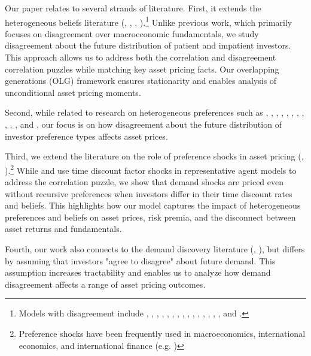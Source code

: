 \documentclass[preprint,11pt,authoryear]{elsarticle}
\theoremstyle{plain}
\begin{document}
Our paper relates to several strands of literature. First, it extends the heterogeneous beliefs literature (\cite{Harrison1978}, \cite{DetempleMurthy1994}, \cite{Zapatero1998}, \cite{Basak2000}).\footnote{Models with disagreement include \cite{ScheinkmanXiong2003}, \cite{Basak2005}, \cite{Berrada2006}, \cite{Burschi06}, \cite{JouiniNapp2007}, \cite{David2008}, \cite{Dumas2009}, \cite{xiong-yan-2010}, \cite{Cvitanic2011}, \cite{cvitanic-jouini-malamud-napp:12}, \cite{BhamraUppal2014}, \cite{Burschi14}, \cite{CujeanHasler17}, \cite{EGHI2017},  \cite{BauerChernov2024a}, and \cite{XiourosZapatero2024}.} Unlike previous work, which primarily focuses on disagreement over macroeconomic fundamentals, we study disagreement about the future distribution of patient and impatient investors. This approach allows us to address both the correlation and disagreement correlation puzzles while matching key asset pricing facts. Our overlapping generations (OLG) framework ensures stationarity and enables analysis of unconditional asset pricing moments.


Second, while related to research on heterogeneous preferences such as \cite{dumas:89}, \cite{wang:96}, \cite{chan-kogan:02}, \cite{GollierZeckhauser05}, \cite{GomesMichaelides08}, \cite{weinbaum:09}, \cite{zapatero-xiouros:10}, \cite{cvitanic-jouini-malamud-napp:12}, \cite{longstaff-wang:12}, \cite{BhamraUppal2014}, \cite{Garleanu2008}, and \cite{EhlingHeyerdahlLarsen2016}, our focus is on how disagreement about the future distribution of investor preference types affects asset prices.  



Third, we extend the literature on the role of preference shocks in asset pricing (\cite{GarberKing83}, \cite{Campbell93}).\footnote{Preference shocks have been frequently used in macroeconomics, international economics, and international finance (e.g. \cite{pavlova-rigobon:07})} While \cite{Maurer12} and \cite{ALBUQUERQUE2016} use time discount factor shocks in representative agent models to address the correlation puzzle, we show that demand shocks are priced even without recursive preferences when investors differ in their time discount rates and beliefs. This highlights how our model captures the impact of heterogeneous preferences and beliefs on asset prices, risk premia, and the disconnect between asset returns and fundamentals.


Fourth, our work also connects to the demand discovery literature (\cite{Grossman1988}, \cite{GallmeyerHollifieldSeppi2017WP}), but differs by assuming that investors "agree to disagree" about future demand. This assumption increases tractability and enables us to analyze how demand disagreement affects a range of asset pricing outcomes.
\end{document}
